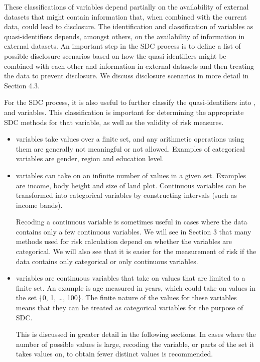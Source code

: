 \documentclass[letterpaper,10pt,english]{sphinxmanual}
\begin{document}
\begin{itemize}
These classifications of variables depend partially on the
availability of external datasets that might contain information
that, when combined with the current data, could lead to disclosure.
The identification and classification of variables as
quasi-identifiers depends, amongst others, on the availability of
information in external datasets. An important step in the SDC
process is to define a list of possible disclosure scenarios based on
how the quasi-identifiers might be combined with each other and
information in external datasets and then treating the data to
prevent disclosure. We discuss disclosure scenarios in more detail in
Section 4.3.

\end{itemize}

For the SDC process, it is also useful to further classify the
quasi-identifiers into ,  and
 variables. This classification is important for
determining the appropriate SDC methods for that variable, as well as
the validity of risk measures.
\begin{itemize}
\item {} 
 variables take values over a finite set, and any
arithmetic operations using them are generally not meaningful or not
allowed. Examples of categorical variables are gender, region and
education level.

\item {} 
 variables can take on an infinite number of values in
a given set. Examples are income, body height and size of land plot.
Continuous variables can be transformed into categorical variables by
constructing intervals (such as income bands). %
\begin{footnote}[1]\sphinxAtStartFootnote
Recoding a continuous variable is sometimes useful in cases where the
data contains only a few continuous variables. We will see in Section
3 that many methods used for risk calculation depend on whether the
variables are categorical. We will also see that it is easier for the
measurement of risk if the data contains only categorical or only
continuous variables.
%
\end{footnote}

\item {} 
 variables are continuous variables that take on
values that are limited to a finite set. An example is age measured
in years, which could take on values in the set \{0, 1, …, 100\}. The
finite nature of the values for these variables means that they can
be treated as categorical variables for the purpose of
SDC. %
\begin{footnote}[2]\sphinxAtStartFootnote
This is discussed in greater detail in the following sections. In
cases where the number of possible values is large, recoding the
variable, or parts of the set it takes values on, to obtain fewer
distinct values is recommended.
%
\end{footnote}

\end{itemize}
\end{document}
